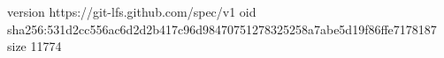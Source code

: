 version https://git-lfs.github.com/spec/v1
oid sha256:531d2cc556ac6d2d2b417c96d98470751278325258a7abe5d19f86ffe7178187
size 11774
